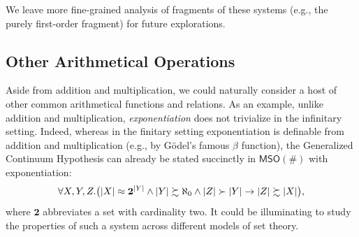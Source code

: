 \documentclass[12pt,oneside,reqno]{amsart}
\theoremstyle{definition}
\begin{document}
We leave more fine-grained analysis of fragments of these systems (e.g., the purely first-order fragment) for future explorations. 

\subsection{Other Arithmetical Operations} Aside from addition and multiplication, we could naturally consider a host of other common arithmetical functions and relations. As an example, unlike addition and multiplication, \emph{exponentiation} does not trivialize in the infinitary setting. Indeed, whereas in the finitary setting exponentiation is definable from addition and multiplication (e.g., by G\"{o}del's famous $\beta$ function), the Generalized Continuum Hypothesis can already be stated succinctly in $\mathsf{MSO}(\#)$ with exponentiation:\vspace{0.5ex} $$\forall X,Y,Z.\big( |X|\approx \mathbf{2}^{|Y|} \wedge |Y|\succsim \aleph_0 \wedge |Z|\succ |Y| \rightarrow |Z| \succsim |X|\big),\vspace{0.5ex} $$ where $\mathbf{2}$ abbreviates a set with cardinality two. %
It could be illuminating to study the properties of such a system across different models of set theory.
\end{document}
